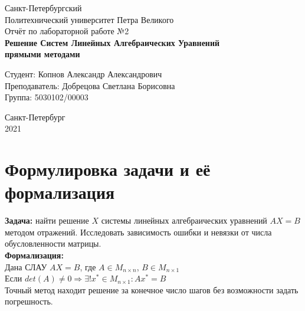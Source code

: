 \documentclass[11pt,a4paper]{article}
\begin{document}
\begin{titlepage}
  \Large
  \begin{center}
    Санкт-Петербургский\\
    Политехнический университет Петра Великого\\
    \vspace{10em}
    Отчёт по лабораторной работе №2\\
    \vspace{2em}
    \textbf{Решение Систем Линейных Алгебраических Уравнений\\
    прямыми методами}
  \end{center}
  \vspace{6em}
  \begin{flushright}
    Студент: Копнов Александр Александрович\\
    Преподаватель: Добрецова Светлана Борисовна\\
    Группа: 5030102/00003
  \end{flushright}
  \vspace{\fill}
  \begin{center}
    Санкт-Петербург\\
    2021
  \end{center}
\end{titlepage}
\tableofcontents
\pagebreak

\section{Формулировка задачи и её формализация}
\textbf{Задача:} найти решение $X$ системы линейных алгебраических уравнений $AX = B$ методом отражений. Исследовать зависимость ошибки и невязки от числа обусловленности матрицы.\\
\textbf{Формализация:}\\
Дана СЛАУ $AX = B$, где $A \in M_{n \times n}$, $B \in M_{n \times 1}$\\
Если $det(A) \neq 0 \Rightarrow \exists! x^{*} \in M_{n\times1} : Ax^{*} = B$\\
Точный метод находит решение за конечное число шагов без возможности задать погрешность.
\end{document}
